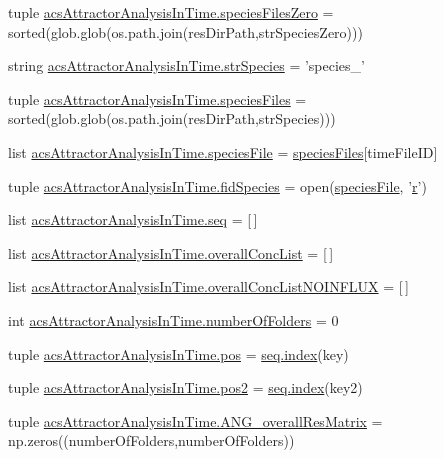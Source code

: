 \begin{DoxyCompactItemize}
\item 
tuple \hyperlink{a00097_a4657fd3a80cf1c76ab075d62d8de3bf3}{acs\-Attractor\-Analysis\-In\-Time.\-species\-Files\-Zero} = sorted(glob.\-glob(os.\-path.\-join(res\-Dir\-Path,str\-Species\-Zero)))
\item 
string \hyperlink{a00097_ac1f05e7db61bcc83ea1ed27460462202}{acs\-Attractor\-Analysis\-In\-Time.\-str\-Species} = 'species\-\_\-'
\item 
tuple \hyperlink{a00097_a18645475f8596346ca431e99661b5674}{acs\-Attractor\-Analysis\-In\-Time.\-species\-Files} = sorted(glob.\-glob(os.\-path.\-join(res\-Dir\-Path,str\-Species)))
\item 
list \hyperlink{a00097_a3c620554bbf7ae30d97a60565fea8d1e}{acs\-Attractor\-Analysis\-In\-Time.\-species\-File} = \hyperlink{a00028_af5703745c2c2a6af7f62da460994d9c2}{species\-Files}\mbox{[}time\-File\-I\-D\mbox{]}
\item 
tuple \hyperlink{a00097_a70d70b9ab98e722475b03465c7f8dbbe}{acs\-Attractor\-Analysis\-In\-Time.\-fid\-Species} = open(\hyperlink{a00027_a7da0c82834970c5f3c3d9224ab832577}{species\-File}, '\hyperlink{a00031_ac862e7284527eb913b1351c8bfb8e079}{r}')
\item 
list \hyperlink{a00097_a1bdf98839177836f238806755e46ac3c}{acs\-Attractor\-Analysis\-In\-Time.\-seq} = \mbox{[}$\,$\mbox{]}
\item 
list \hyperlink{a00097_a2cebadd75179c46e551a2facbdd2741b}{acs\-Attractor\-Analysis\-In\-Time.\-overall\-Conc\-List} = \mbox{[}$\,$\mbox{]}
\item 
list \hyperlink{a00097_ad7eab833592c6cd395f9e2416dd13920}{acs\-Attractor\-Analysis\-In\-Time.\-overall\-Conc\-List\-N\-O\-I\-N\-F\-L\-U\-X} = \mbox{[}$\,$\mbox{]}
\item 
int \hyperlink{a00097_a3a2fe097086bb0f4a505fca8f53dc2b0}{acs\-Attractor\-Analysis\-In\-Time.\-number\-Of\-Folders} = 0
\item 
tuple \hyperlink{a00097_aa39692272363cd6f687c4b2a53f96594}{acs\-Attractor\-Analysis\-In\-Time.\-pos} = \hyperlink{a00060_a0cd6a44ffb07342cbc7e5ac33bfc9495}{seq.\-index}(key)
\item 
tuple \hyperlink{a00097_a49fec7e1deea4728b5ef4a487d155de9}{acs\-Attractor\-Analysis\-In\-Time.\-pos2} = \hyperlink{a00060_a0cd6a44ffb07342cbc7e5ac33bfc9495}{seq.\-index}(key2)
\item 
tuple \hyperlink{a00097_a15adfffa273548845cea67d8b89f0bb1}{acs\-Attractor\-Analysis\-In\-Time.\-A\-N\-G\-\_\-overall\-Res\-Matrix} = np.\-zeros((number\-Of\-Folders,number\-Of\-Folders))

\end{DoxyCompactItemize}
